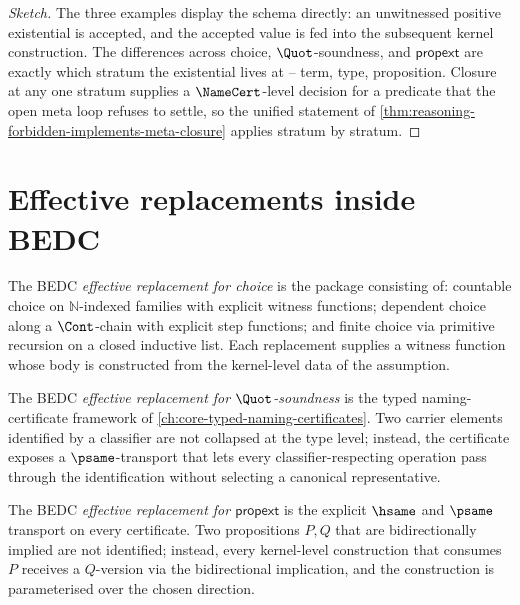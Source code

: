 \begin{proof}[Sketch]
The three examples display the schema directly: an unwitnessed positive existential is accepted, and the accepted value is fed into the subsequent kernel construction. The differences across choice, $\Quot$-soundness, and $\mathsf{propext}$ are exactly which stratum the existential lives at -- term, type, proposition. Closure at any one stratum supplies a $\NameCert$-level decision for a predicate that the open meta loop refuses to settle, so the unified statement of \autoref{thm:reasoning-forbidden-implements-meta-closure} applies stratum by stratum.
\end{proof}

\section{Effective replacements inside BEDC}
\label{sec:three-axioms-replacements}

\begin{definition}
\label{def:three-axioms-replacement-choice}
The BEDC \emph{effective replacement for choice} is the package consisting of: countable choice on $\mathbb{N}$-indexed families with explicit witness functions; dependent choice along a $\Cont$-chain with explicit step functions; and finite choice via primitive recursion on a closed inductive list. Each replacement supplies a witness function whose body is constructed from the kernel-level data of the assumption.
\end{definition}

\begin{definition}
\label{def:three-axioms-replacement-quot}
The BEDC \emph{effective replacement for $\Quot$-soundness} is the typed naming-certificate framework of \autoref{ch:core-typed-naming-certificates}. Two carrier elements identified by a classifier are not collapsed at the type level; instead, the certificate exposes a $\psame$-transport that lets every classifier-respecting operation pass through the identification without selecting a canonical representative.
\end{definition}

\begin{definition}
\label{def:three-axioms-replacement-propext}
The BEDC \emph{effective replacement for $\mathsf{propext}$} is the explicit $\hsame$ and $\psame$ transport on every certificate. Two propositions $P, Q$ that are bidirectionally implied are not identified; instead, every kernel-level construction that consumes $P$ receives a $Q$-version via the bidirectional implication, and the construction is parameterised over the chosen direction.
\end{definition}

